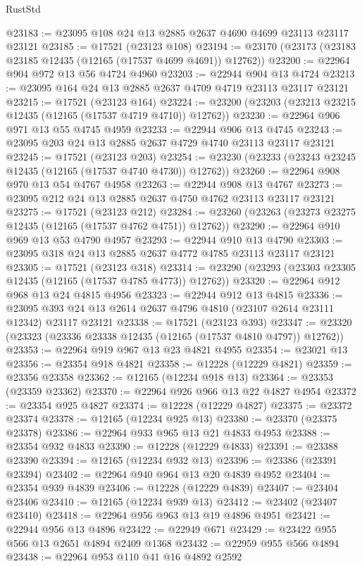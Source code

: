\begin{lexlean}{RustStd}
\begin{coremodule}
@23183 := @23095 @108 @24 @13 @2885 @2637 @4690 @4699 @23113 @23117 @23121
@23185 := @17521 (@23123 @108)
@23194 := @23170 (@23173 (@23183 @23185 @12435 (@12165 (@17537 @4699 @4691)) @12762))
@23200 := @22964 @904 @972 @13 @56 @4724 @4960
@23203 := @22944 @904 @13 @4724
@23213 := @23095 @164 @24 @13 @2885 @2637 @4709 @4719 @23113 @23117 @23121
@23215 := @17521 (@23123 @164)
@23224 := @23200 (@23203 (@23213 @23215 @12435 (@12165 (@17537 @4719 @4710)) @12762))
@23230 := @22964 @906 @971 @13 @55 @4745 @4959
@23233 := @22944 @906 @13 @4745
@23243 := @23095 @203 @24 @13 @2885 @2637 @4729 @4740 @23113 @23117 @23121
@23245 := @17521 (@23123 @203)
@23254 := @23230 (@23233 (@23243 @23245 @12435 (@12165 (@17537 @4740 @4730)) @12762))
@23260 := @22964 @908 @970 @13 @54 @4767 @4958
@23263 := @22944 @908 @13 @4767
@23273 := @23095 @212 @24 @13 @2885 @2637 @4750 @4762 @23113 @23117 @23121
@23275 := @17521 (@23123 @212)
@23284 := @23260 (@23263 (@23273 @23275 @12435 (@12165 (@17537 @4762 @4751)) @12762))
@23290 := @22964 @910 @969 @13 @53 @4790 @4957
@23293 := @22944 @910 @13 @4790
@23303 := @23095 @318 @24 @13 @2885 @2637 @4772 @4785 @23113 @23117 @23121
@23305 := @17521 (@23123 @318)
@23314 := @23290 (@23293 (@23303 @23305 @12435 (@12165 (@17537 @4785 @4773)) @12762))
@23320 := @22964 @912 @968 @13 @24 @4815 @4956
@23323 := @22944 @912 @13 @4815
@23336 := @23095 @393 @24 @13 @2614 @2637 @4796 @4810 (@23107 @2614 @23111 @12342) @23117 @23121
@23338 := @17521 (@23123 @393)
@23347 := @23320 (@23323 (@23336 @23338 @12435 (@12165 (@17537 @4810 @4797)) @12762))
@23353 := @22964 @919 @967 @13 @23 @4821 @4955
@23354 := @23021 @13
@23356 := @23354 @918 @4821
@23358 := @12228 (@12229 @4821)
@23359 := @23356 @23358
@23362 := @12165 (@12234 @918 @13)
@23364 := @23353 (@23359 @23362)
@23370 := @22964 @926 @966 @13 @22 @4827 @4954
@23372 := @23354 @925 @4827
@23374 := @12228 (@12229 @4827)
@23375 := @23372 @23374
@23378 := @12165 (@12234 @925 @13)
@23380 := @23370 (@23375 @23378)
@23386 := @22964 @933 @965 @13 @21 @4833 @4953
@23388 := @23354 @932 @4833
@23390 := @12228 (@12229 @4833)
@23391 := @23388 @23390
@23394 := @12165 (@12234 @932 @13)
@23396 := @23386 (@23391 @23394)
@23402 := @22964 @940 @964 @13 @20 @4839 @4952
@23404 := @23354 @939 @4839
@23406 := @12228 (@12229 @4839)
@23407 := @23404 @23406
@23410 := @12165 (@12234 @939 @13)
@23412 := @23402 (@23407 @23410)
@23418 := @22964 @956 @963 @13 @19 @4896 @4951
@23421 := @22944 @956 @13 @4896
@23422 := @22949 @671
@23429 := @23422 @955 @566 @13 @2651 @4894 @2409 @1368
@23432 := @22959 @955 @566 @4894
@23438 := @22964 @953 @110 @41 @16 @4892 @2592

\end{coremodule}
\end{lexlean}
